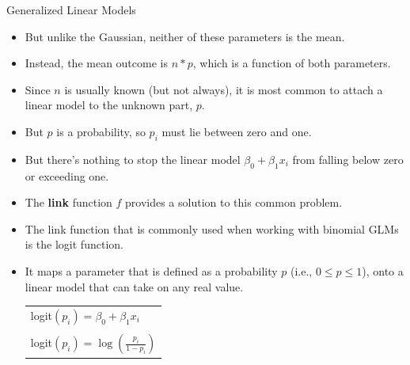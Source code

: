 \documentclass[handout]{beamer}
\begin{document}
\begin{frame}{Generalized Linear Models}
\scriptsize{
\begin{itemize}

\item But unlike the Gaussian, neither of these parameters is the mean.
\item Instead, the mean outcome is $n*p$, which is a function of both parameters.
\item Since $n$ is usually known (but not always), it is most common to attach a linear model to the unknown part, $p$.
\item But $p$ is a probability, so $p_i$ must lie between zero and one.
\item But there's nothing to stop the linear model $\beta_0 + \beta_1 x_i$ from falling below zero or exceeding one.
\item The \textbf{link} function $f$ provides a solution to this common problem.

\item The link function that is commonly used when working with binomial GLMs is the logit function.

\item It maps a parameter that is defined as a probability $p$ (i.e., $0\leq p\leq 1$), onto a linear model that can take on any real value.

 \vspace{0.3cm}
 \begin{table}
 \centering
 \begin{tabular}{l}
logit$(p_i) = \beta_0 + \beta_1 x_i$ \\ \\
logit$(p_i) = \log\left(\frac{p_i}{1-p_i}\right)$
\end{tabular}
\end{table}
 \vspace{0.3cm}


\end{itemize}



}

\end{frame}
\end{document}
